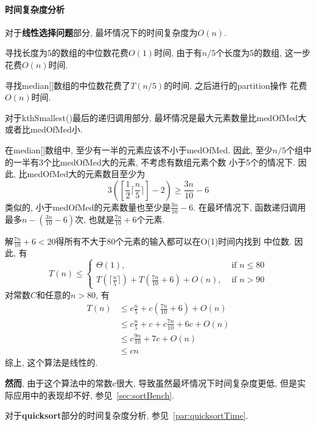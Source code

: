 \paragraph{时间复杂度分析}
对于\textbf{线性选择问题}部分, 最坏情况下的时间复杂度为$O(n)$.\par
寻找长度为5的数组的中位数花费$O(1)$时间, 由于有$n/5$个长度为5的数组,
这一步花费$O(n)$时间.\par
寻找median[]数组的中位数花费了$T(n/5)$的时间. 之后进行的partition操作
花费$O(n)$时间.\par
对于kthSmallest()最后的递归调用部分, 最坏情况是最大元素数量比medOfMed大
或者比medOfMed小.\par
在median[]数组中, 至少有一半的元素应该不小于medOfMed.
因此, 至少$n/5$个组中的一半有3个比medOfMed大的元素, 不考虑有数组元素个数
小于5个的情况下. 因此, 比medOfMed大的元素数目至少为
\begin{equation}
	3([\frac{1}{2}\lceil\frac{n}{5}\rceil]-2)\geq\frac{3n}{10}-6
	\label{eq:kthSmallest1}
\end{equation}
类似的, 小于medOfMed的元素数量也至少是$\frac{3n}{10}-6$. 在最坏情况下,
函数递归调用最多$n-(\frac{3n}{10}-6)$次, 也就是$\frac{7n}{10}+6$个元素.\par
解$\frac{7n}{10}+6<20$得所有不大于80个元素的输入都可以在O(1)时间内找到
中位数. 因此, 有
\begin{equation}
	T(n) \leq
	\begin{cases}
		\Theta(1),                                          & \text{ if }n \leq 80 \\
		T(\lceil\frac{n}{5}\rceil)+T(\frac{7n}{10}+6)+O(n), & \text{ if }n > 90
	\end{cases}
	\label{eq:kthSmallest2}
\end{equation}
对常数$C$和任意的$n>80$, 有
\begin{align}
	T(n) & \leq c\frac{n}{5}+c(\frac{7n}{10}+6)+O(n)  \nonumber \\
	     & \leq c\frac{n}{5}+c+c\frac{7n}{10}+6c+O(n) \nonumber \\
	     & \leq c\frac{9n}{10}+7c+O(n)                \nonumber \\
	     & \leq cn \nonumber
	\label{eq:kthSmallest3}
\end{align}
综上, 这个算法是线性的.\par
\textbf{然而}, 由于这个算法中的常数c很大, 导致虽然最坏情况下时间复杂度更低,
但是实际应用中的表现却不好, 参见~\ref{sec:sortBench}.\par
对于\textbf{quicksort}部分的时间复杂度分析, 参见~\ref{par:quicksortTime}.
